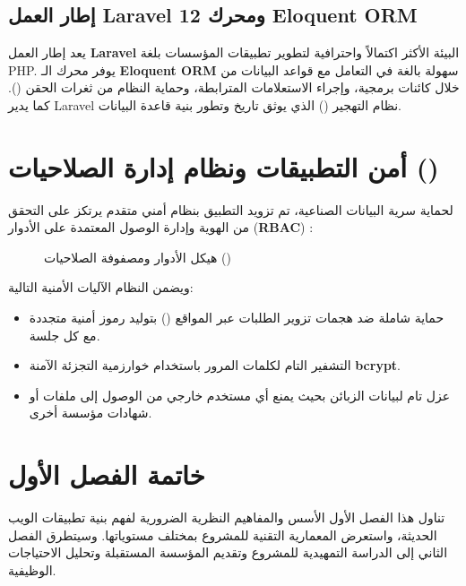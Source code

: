 \documentclass{bts-report-ar}
\begin{document}
\subsection{إطار العمل Laravel 12 ومحرك Eloquent ORM}
يعد إطار العمل \textbf{Laravel} البيئة الأكثر اكتمالاً واحترافية لتطوير تطبيقات المؤسسات بلغة PHP. يوفر محرك الـ \textbf{Eloquent ORM} سهولة بالغة في التعامل مع قواعد البيانات من خلال كائنات برمجية، وإجراء الاستعلامات المترابطة، وحماية النظام من ثغرات الحقن (). كما يدير Laravel نظام التهجير () الذي يوثق تاريخ وتطور بنية قاعدة البيانات.

\section{أمن التطبيقات ونظام إدارة الصلاحيات ()}
لحماية سرية البيانات الصناعية، تم تزويد التطبيق بنظام أمني متقدم يرتكز على التحقق من الهوية وإدارة الوصول المعتمدة على الأدوار (\textbf{RBAC}) :

\begin{figure}[H]
  \centering
  \begin{LTR}
  
  \end{LTR}
  \caption{هيكل الأدوار ومصفوفة الصلاحيات ()}
  \label{fig:rbac-model}
\end{figure}

ويضمن النظام الآليات الأمنية التالية:
\begin{itemize}
  \item حماية شاملة ضد هجمات تزوير الطلبات عبر المواقع () بتوليد رموز أمنية متجددة مع كل جلسة.
  \item التشفير التام لكلمات المرور باستخدام خوارزمية التجزئة الآمنة \textbf{bcrypt}.
  \item عزل تام لبيانات الزبائن بحيث يمنع أي مستخدم خارجي من الوصول إلى ملفات أو شهادات مؤسسة أخرى.
\end{itemize}

\section*{خاتمة الفصل الأول}
تناول هذا الفصل الأول الأسس والمفاهيم النظرية الضرورية لفهم بنية تطبيقات الويب الحديثة، واستعرض المعمارية التقنية للمشروع بمختلف مستوياتها. وسيتطرق الفصل الثاني إلى الدراسة التمهيدية للمشروع وتقديم المؤسسة المستقبلة وتحليل الاحتياجات الوظيفية.


\end{document}
